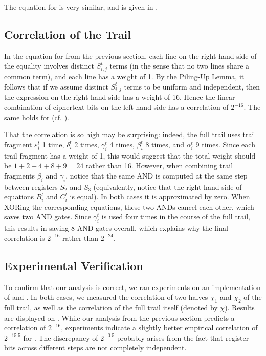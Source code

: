 The equation for \MiniMORUS[640] is very similar, and is given in .

\subsection{Correlation of the Trail}
\label{sec:minibias}

In the equation for \MiniMORUS[1280] from the previous section, each line on the right-hand side of the equality involves distinct $S^t_{i,j}$ terms (in the sense that no two lines share a common term), and each line has a weight of 1. By the Piling-Up Lemma, it follows that if we assume distinct $S^t_{i,j}$ terms to be uniform and independent, then the expression on the right-hand side has a weight of 16. Hence the linear combination of ciphertext bits on the left-hand side has a correlation of $2^{-16}$. The same holds for \MiniMORUS[640] (cf. ).

That the correlation is so high may be surprising: indeed, the full trail uses trail fragment $\varepsilon^t_i$ 1 time, $\delta^t_i$ 2 times, $\gamma^t_i$ 4 times, $\beta^t_i$ 8 times, and $\alpha^t_i$ 9 times. Since each trail fragment has a weight of 1, this would suggest that the total weight should be $1+2+4+8+9 = 24$ rather than 16. However, when combining trail fragments $\beta_i$ and $\gamma_i$, notice that the same AND is computed at the same step between registers $S_2$ and $S_3$ (equivalently, notice that the right-hand side of equations $B^t_i$ and $C^t_i$ is equal). In both cases it is approximated by zero. When XORing the corresponding equations, these two ANDs cancel each other, which saves two AND gates. Since $\gamma^t_i$ is used four times in the course of the full trail, this results in saving 8 AND gates overall, which explains why the final correlation is $2^{-16}$ rather than $2^{-24}$.

\subsection{Experimental Verification}

To confirm that our analysis is correct, we ran experiments on an implementation of \MiniMORUS[1280] and \MiniMORUS[640]. In both cases, we measured the correlation of two halves $\chi_1$ and $\chi_2$ of the full trail, as well as the correlation of the full trail itself (denoted by $\chi$). Results are displayed on .
While our analysis from the previous section predicts a correlation of $2^{-16}$, experiments indicate a slightly better empirical correlation of $2^{-15.5}$ for \MORUS[640]. The discrepancy of $2^{-0.5}$ probably arises from the fact that register bits across different steps are not completely independent.

